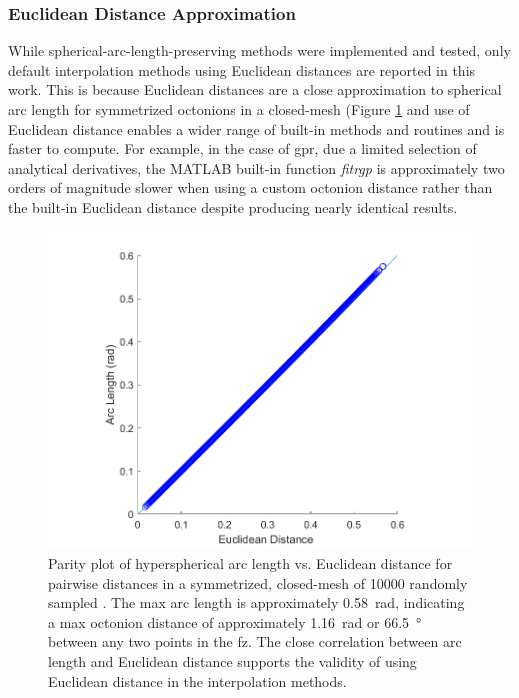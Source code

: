 \documentclass[preprint,12pt]{elsarticle}
\begin{document}
\subsubsection{Euclidean Distance Approximation}
While spherical-arc-length-preserving methods were implemented and tested, only default interpolation methods using Euclidean distances are reported in this work. This is because Euclidean distances are a close approximation to spherical arc length for symmetrized octonions in a closed-mesh (Figure \ref{fig:dist-parity} and use of Euclidean distance enables a wider range of built-in methods and routines and is faster to compute. For example, in the case of \gls{gpr}, due a limited selection of analytical derivatives, the MATLAB built-in function \textit{fitrgp} is approximately two orders of magnitude slower when using a custom octonion distance rather than the built-in Euclidean distance despite producing nearly identical results.

\begin{figure}
\centering
\includegraphics{dist-parity.png}
\caption{Parity plot of hyperspherical arc length vs. Euclidean distance for pairwise distances in a symmetrized, closed-mesh of \num{10000} randomly sampled . The max arc length is approximately \SI{0.58}{\radian}, indicating a max octonion distance of approximately \SI{1.16}{\radian} or \SI{66.5}{\degree} between any two points in the \acrlong{fz}. The close correlation between arc length and Euclidean distance supports the validity of using Euclidean distance in the interpolation methods.}
\label{fig:dist-parity}
\end{figure}
\end{document}
